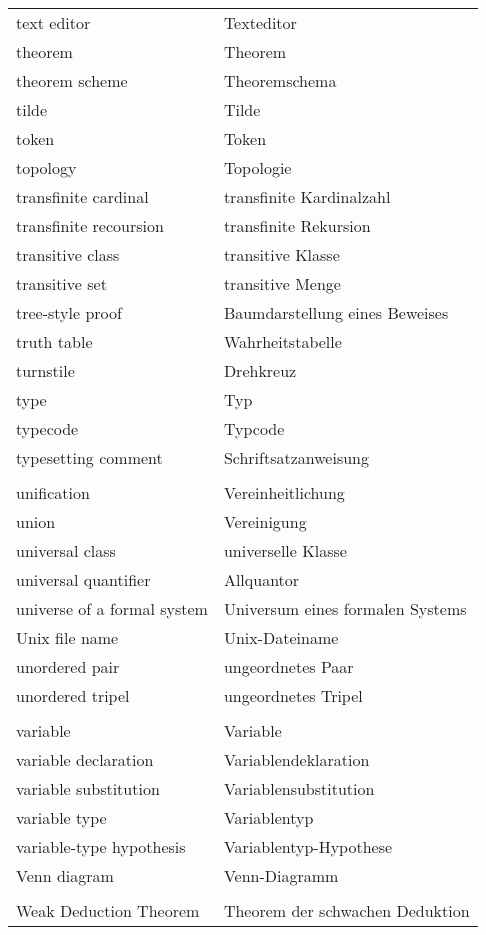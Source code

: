 \begin{longtabu}   { @{} X[l] X[l] }
    text editor & Texteditor \\
    theorem & Theorem \\
    theorem scheme & Theoremschema \\
    tilde & Tilde \\
    token & Token \\
    topology & Topologie \\
    transfinite cardinal & transfinite Kardinalzahl \\
    transfinite recoursion & transfinite Rekursion \\
    transitive class & transitive Klasse \\
    transitive set & transitive Menge \\
    tree-style proof & Baumdarstellung eines Beweises \\
    truth table & Wahrheitstabelle \\
    turnstile & Drehkreuz \\
    type & Typ \\
    typecode & Typcode \\
    typesetting comment & Schriftsatzanweisung \\
     & \\
    unification & Vereinheitlichung \\
    union & Vereinigung \\
    universal class & universelle Klasse \\
    universal quantifier & Allquantor \\
    universe of a formal system & Universum eines formalen Systems \\
    Unix file name & Unix-Dateiname \\
    unordered pair & ungeordnetes Paar \\
    unordered tripel & ungeordnetes Tripel \\
     & \\
    variable & Variable \\
    variable declaration & Variablendeklaration \\
    variable substitution & Variablensubstitution \\
    variable type & Variablentyp \\
    variable-type hypothesis & Variablentyp-Hypothese \\
    Venn diagram & Venn-Diagramm \\
     & \\
    Weak Deduction Theorem & Theorem der schwachen Deduktion \\

\end{longtabu}
